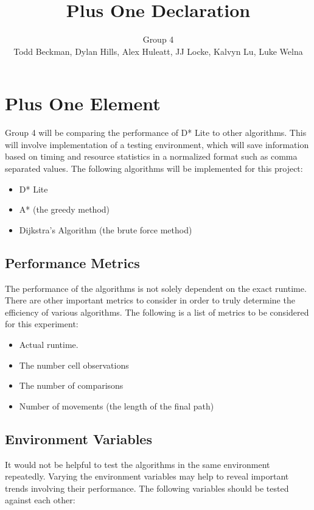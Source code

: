 \documentclass[11pt]{article}
\title{Plus One Declaration}
\author{Group 4\\
\small{Todd Beckman, Dylan Hills, Alex Huleatt, JJ Locke, Kalvyn Lu, Luke Welna}}
\date{}
\begin{document}
\maketitle
\section{Plus One Element}

Group 4 will be comparing the performance of D* Lite to other algorithms. This will involve implementation
of a testing environment, which will save information based on timing and resource statistics in a normalized
format such as comma separated values. The following algorithms will be implemented for this project:

\begin{itemize}
    \item D* Lite
    \item A* (the greedy method)
    \item Dijkstra's Algorithm (the brute force method)
\end{itemize}

\subsection{Performance Metrics}

The performance of the algorithms is not solely dependent on the exact runtime. There are other important
metrics to consider in order to truly determine the efficiency of various algorithms. The following is a list of metrics to be considered for this experiment:

\begin{itemize}
    \item Actual runtime.
    \item The number cell observations
    \item The number of comparisons
    \item Number of movements (the length of the final path)
\end{itemize}

\subsection{Environment Variables}

It would not be helpful to test the algorithms in the same environment repeatedly. Varying the environment variables may help to reveal important trends involving their performance. The following variables should be tested against each other:
\end{document}
